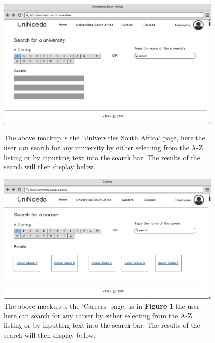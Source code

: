 \documentclass[a4paper, 12pt]{article}
\begin{document}
\begin{figure}[H]
\centering
\includegraphics[scale=0.4]{UniversitiesSouthAfrica}
\caption{The above mockup is the 'Universities South Africa' page, here the user can search for any university by either selecting from the A-Z listing or by inputting text into the search bar. The results of the search will then display below.}
\label{UniversitiesSouthAfrica}

\vspace{1cm}

\includegraphics[scale=0.4]{CareersPage}
\caption{The above mockup is the 'Careers' page, as in \textbf{Figure 1} the user here can search for any career by either selecting from the A-Z listing or by inputting text into the search bar. The results of the search will then display below.}
\label{CareersPage}
\end{figure}
\end{document}
